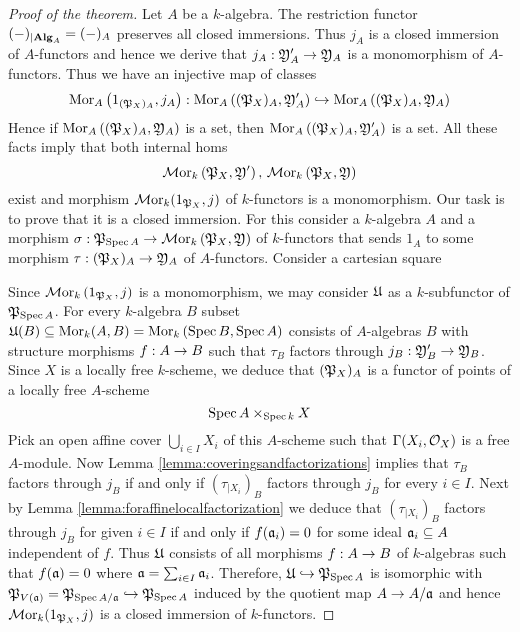 \begin{proof}[Proof of the theorem]
Let $A$ be a $k$-algebra. The restriction functor $(-)_{\mid \mathbf{Alg}_A} = (-)_A$ preserves all closed immersions. Thus $j_A$ is a closed immersion of $A$-functors and hence we derive that $j_A:{\mathfrak Y}'_A\rightarrow {\mathfrak Y}_A$ is a monomorphism of $A$-functors. Thus we have an injective  map of classes
$$\mathrm{Mor}_A\left(1_{({\mathfrak P}_X)_A},j_A\right):\mathrm{Mor}_A\left(({\mathfrak P}_X)_A,{\mathfrak Y}'_A\right)\hookrightarrow \mathrm{Mor}_A\left(({\mathfrak P}_X)_A,{\mathfrak Y}_A\right)$$
Hence if $\mathrm{Mor}_A\left(({\mathfrak P}_X)_A,{\mathfrak Y}_A\right)$ is a set, then $\mathrm{Mor}_A\left(({\mathfrak P}_X)_A,{\mathfrak Y}'_A\right)$ is a set. All these facts imply that both internal homs
$$\mathcal{M}\mathrm{or}_k\left({\mathfrak P}_X,{\mathfrak Y}'\right),\,\mathcal{M}\mathrm{or}_k\left({\mathfrak P}_X,{\mathfrak Y}\right)$$
exist and morphism $\mathcal{M}\mathrm{or}_k(1_{{\mathfrak P}_X},j)$ of $k$-functors is a monomorphism. Our task is to prove that it is a closed immersion. For this consider a $k$-algebra $A$ and a morphism $\sigma:{\mathfrak P}_{\mathrm{Spec}\, A}\rightarrow \mathcal{M}\mathrm{or}_k\left({\mathfrak P}_X,{\mathfrak Y}\right)$ of $k$-functors that sends $1_A$ to some morphism $\tau:({\mathfrak P}_X)_A\rightarrow {\mathfrak Y}_A$ of $A$-functors. Consider a cartesian square
\begin{center}
\end{center}
Since $\mathcal{M}\mathrm{or}_k\left(1_{{\mathfrak P}_X},j\right)$ is a monomorphism, we may consider ${\mathfrak U}$ as a $k$-subfunctor of ${\mathfrak P}_{\mathrm{Spec}\, A}$. For every $k$-algebra $B$ subset ${\mathfrak U}(B)\subseteq \mathrm{Mor}_k(A,B)= \mathrm{Mor}_k\left(\mathrm{Spec}\, B,\mathrm{Spec}\, A\right)$ consists of $A$-algebras $B$ with structure morphisms $f:A\rightarrow B$ such that $\tau_B$ factors through $j_B:{\mathfrak Y}'_B\rightarrow {\mathfrak Y}_B$. Since $X$ is a locally free $k$-scheme, we deduce that $({\mathfrak P}_{X})_A$ is a functor of points of a locally free $A$-scheme
$$\mathrm{Spec}\, A\times_{\mathrm{Spec}\, k}X$$
Pick an open affine cover $\bigcup_{i\in I}X_i$ of this $A$-scheme such that $\Gamma(X_i,{\mathcal O}_X)$ is a free $A$-module. Now Lemma \ref{lemma:coveringsandfactorizations} implies that $\tau_B$ factors through $j_B$ if and only if $\left(\tau_{\mid X_i}\right)_B$ factors through $j_B$ for every $i\in I$. Next by Lemma \ref{lemma:foraffinelocalfactorization} we deduce that $\left(\tau_{\mid X_i}\right)_B$  factors through $j_B$ for given $i\in I$ if and only if $f(\mathfrak{a}_i)=0$ for some ideal $\mathfrak{a}_i\subseteq A$ independent of $f$. Thus ${\mathfrak U}$ consists of all morphisms $f:A\rightarrow B$ of $k$-algebras such that $f(\mathfrak{a})=0$ where $\mathfrak{a} = \sum_{i\in I}\mathfrak{a}_i$. Therefore, ${\mathfrak U}\hookrightarrow {\mathfrak P}_{\mathrm{Spec}\, A}$ is isomorphic with ${\mathfrak P}_{V(\mathfrak{a})} = {\mathfrak P}_{\mathrm{Spec}\, A/\mathfrak{a}}\hookrightarrow {\mathfrak P}_{\mathrm{Spec}\, A}$ induced by the quotient map $A\rightarrow A/\mathfrak{a}$ and hence $\mathcal{M}\mathrm{or}_k(1_{{\mathfrak P}_X},j)$ is a closed immersion of $k$-functors.
\end{proof}











\small




